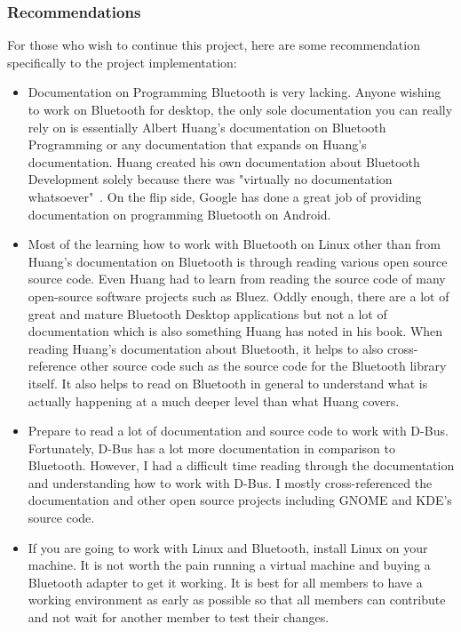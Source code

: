 \documentclass[letterpaper,twocolumn,10pt]{article}
\begin{document}
{{\subsubsection{Recommendations}

For those who wish to continue this project, here are some recommendation specifically to the project implementation:
\begin{singlespacing}
\begin{itemize}
\item Documentation on Programming Bluetooth is very lacking. Anyone wishing to work on Bluetooth for desktop, the only sole documentation you can really rely on is essentially Albert Huang's documentation on Bluetooth Programming or any documentation that expands on Huang's documentation. Huang created his own documentation about Bluetooth Development solely because there was "virtually no documentation whatsoever"~\cite{huang}. On the flip side, Google has done a great job of providing documentation on programming Bluetooth on Android.

\item Most of the learning how to work with Bluetooth on Linux other than from Huang's documentation on Bluetooth is through reading various open source source code. Even Huang had to learn from reading the source code of many open-source software projects such as Bluez. Oddly enough, there are a lot of great and mature Bluetooth Desktop applications but not a lot of documentation which is also something Huang has noted in his book. When reading Huang's documentation about Bluetooth, it helps to also cross-reference other source code such as the source code for the Bluetooth library itself. It also helps to read on Bluetooth in general to understand what is actually happening at a much deeper level than what Huang covers.

\item Prepare to read a lot of documentation and source code to work with D-Bus. Fortunately, D-Bus has a lot more documentation in comparison to Bluetooth. However, I had a difficult time reading through the documentation and understanding how to work with D-Bus. I mostly cross-referenced the documentation and other open source projects including GNOME and KDE's source code.

\item If you are going to work with Linux and Bluetooth, install Linux on your machine. It is not worth the pain running a virtual machine and buying a Bluetooth adapter to get it working. It is best for all members to have a working environment as early as possible so that all members can contribute and not wait for another member to test their changes.


\end{itemize}
\end{singlespacing}}}
\end{document}
